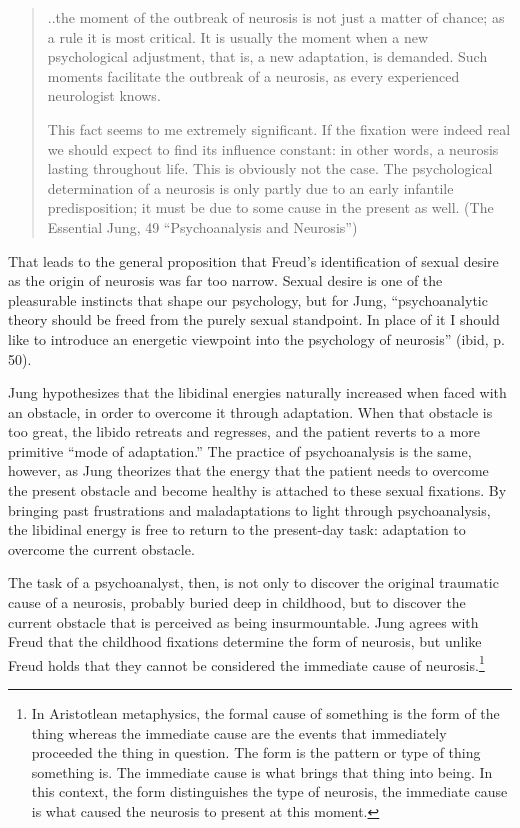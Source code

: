 \begin{quote}

..the moment of the outbreak of neurosis is not just a matter of chance; as a rule it is most critical. It is usually the moment when a new psychological adjustment, that is, a new adaptation, is demanded. Such moments facilitate the outbreak of a neurosis, as every experienced neurologist knows.

This fact seems to me extremely significant. If the fixation were indeed real we should expect to find its influence constant: in other words, a neurosis lasting throughout life. This is obviously not the case. The psychological determination of a neurosis is only partly due to an early infantile predisposition; it must be due to some cause in the present as well. (The Essential Jung, 49 “Psychoanalysis and Neurosis”)
\end{quote}

That leads to the general proposition that Freud's identification of sexual desire as the origin of neurosis was far too narrow. Sexual desire is one of the pleasurable instincts that shape our psychology, but for Jung, “psychoanalytic theory should be freed from the purely sexual standpoint. In place of it I should like to introduce an energetic viewpoint into the psychology of neurosis” (ibid, p. 50).

Jung hypothesizes that the libidinal energies naturally increased when faced with an obstacle, in order to overcome it through adaptation. When that obstacle is too great, the libido retreats and regresses, and the patient reverts to a more primitive “mode of adaptation.” The practice of psychoanalysis is the same, however, as Jung theorizes that the energy that the patient needs to overcome the present obstacle and become healthy is attached to these sexual fixations. By bringing past frustrations and maladaptations to light through psychoanalysis, the libidinal energy is free to return to the present-day task: adaptation to overcome the current obstacle.

The task of a psychoanalyst, then, is not only to discover the original traumatic cause of a neurosis, probably buried deep in childhood, but to discover the current obstacle that is perceived as being insurmountable. Jung agrees with Freud that the childhood fixations determine the form of neurosis, but unlike Freud holds that they cannot be considered the immediate cause of neurosis.\footnote{In Aristotlean metaphysics, the formal cause of something is the form of the thing whereas the immediate cause are the events that immediately proceeded the thing in question. The form is the pattern or type of thing something is. The immediate cause is what brings that thing into being. In this context, the form distinguishes the type of neurosis, the immediate cause is what caused the neurosis to present at this moment.}

